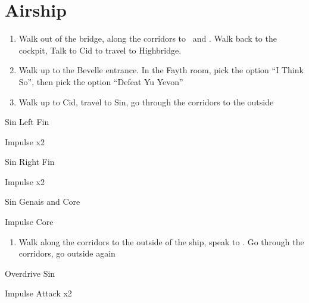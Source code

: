 \chapter{Airship}
\begin{enumerate}
    \item Walk out of the bridge, along the corridors to \yuna\ and \kimahri. Walk back to the cockpit, Talk to Cid to travel to Highbridge.
    \item Walk up to the Bevelle entrance. In the Fayth room, pick the  option ``I Think So'', then pick the  option ``Defeat Yu Yevon''
    \item Walk up to Cid, travel to Sin, go through the corridors to the outside
\end{enumerate}
\begin{battle}[65000]{Sin Left Fin}
    \begin{itemize}
        \summon{\bahamut}
        \bahamutf Impulse x2
    \end{itemize}
\end{battle}
\begin{battle}[65000]{Sin Right Fin}
    \begin{itemize}
        \summon{\bahamut}
        \bahamutf Impulse x2
    \end{itemize}
\end{battle}
\begin{battle}[56000]{Sin Genais and Core}
    \begin{itemize}
        \summon{\bahamut}
        \bahamutf Impulse Core
    \end{itemize}
\end{battle}
\begin{enumerate}[resume]
    \item Walk along the corridors to the outside of the ship, speak to \yuna. Go through the corridors, go outside again
\end{enumerate}
\begin{battle}[140000]{Overdrive Sin}
    \begin{itemize}
        \summon{\bahamut}
        \bahamutf Impulse
        \bahamutf Attack x2
    \end{itemize}
\end{battle}
